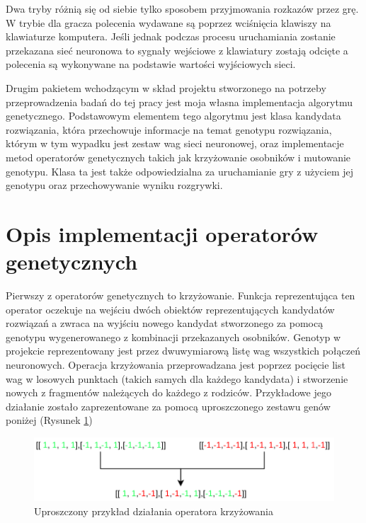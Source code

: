 \documentclass[12pt, oneside, a4paper]{report}
\begin{document}
Dwa tryby różnią się od siebie tylko sposobem przyjmowania rozkazów przez grę. W trybie dla gracza polecenia wydawane są poprzez wciśnięcia klawiszy na klawiaturze komputera. Jeśli jednak podczas procesu uruchamiania zostanie przekazana sieć neuronowa to sygnały wejściowe z klawiatury zostają odcięte a polecenia są wykonywane na podstawie wartości wyjściowych sieci.

Drugim pakietem wchodzącym w skład projektu stworzonego na potrzeby przeprowadzenia badań do tej pracy jest moja własna implementacja algorytmu genetycznego. Podstawowym elementem tego algorytmu jest klasa kandydata rozwiązania, która przechowuje informacje na temat genotypu rozwiązania, którym w tym wypadku jest zestaw wag sieci neuronowej, oraz implementacje metod operatorów genetycznych takich jak krzyżowanie osobników i mutowanie genotypu. Klasa ta jest także odpowiedzialna za uruchamianie gry z użyciem jej genotypu oraz przechowywanie wyniku rozgrywki.

\section{Opis implementacji operatorów genetycznych}

Pierwszy z operatorów genetycznych to krzyżowanie. Funkcja reprezentująca ten operator oczekuje na wejściu dwóch obiektów reprezentujących kandydatów rozwiązań a zwraca na wyjściu nowego kandydat stworzonego za pomocą genotypu wygenerowanego z kombinacji przekazanych osobników. Genotyp w projekcie reprezentowany jest przez dwuwymiarową listę wag wszystkich połączeń neuronowych. Operacja krzyżowania przeprowadzana jest poprzez pocięcie list wag w losowych punktach (takich samych dla każdego kandydata) i stworzenie nowych z fragmentów należących do każdego z rodziców. Przykładowe jego działanie zostało zaprezentowane za pomocą uproszczonego zestawu genów poniżej (Rysunek \ref{fig: 4.3.crossing})

\begin{figure}[h]
	\centering
	\includegraphics[width=14cm]{fig431.png}
	\caption{Uproszczony przykład działania operatora krzyżowania}
	\label{fig: 4.3.crossing}
\end{figure}
\newpage
\end{document}
